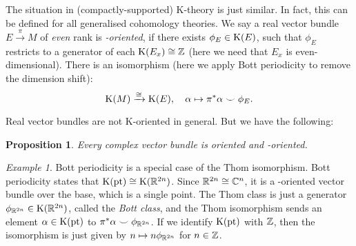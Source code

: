\documentclass[reqno]{scrartcl}
\newtheorem{proposition}[theorem]{Proposition}
\theoremstyle{definition}
\theoremstyle{remark}
\newtheorem{example}[theorem]{Example}
\renewcommand{\cup}{\smile}
\begin{document}
The situation in (compactly-supported) K-theory is just similar. In fact, this can be defined for all generalised cohomology theories. We say a real vector bundle $E\xrightarrow{\pi}M$ of \emph{even} rank is \emph{\K-oriented}, if there exists $\phi_E\in\operatorname{K}(E)$, such that $\phi_E$ restricts to a generator of each $\operatorname{K}(E_x)\cong\mathbb{Z}$ (here we need that $E_x$ is even-dimensional). There is an isomorphism (here we apply Bott periodicity to remove the dimension shift):
\[ \K(M)\xrightarrow{\cong}\K(E),\quad \alpha\mapsto\pi^*\alpha\cup\phi_E. \]

Real vector bundles are not K-oriented in general. But we have the following:
\begin{proposition}\label{Prop: complex vector bundles are oriented and K-oriented}
Every complex vector bundle is oriented and \K-oriented.
\end{proposition}

\begin{example}
Bott periodicity is a special case of the Thom isomorphism. Bott periodicity states that $\operatorname{K}(\operatorname{pt})\cong\operatorname{K}(\mathbb{R}^{2n})$. Since $\mathbb{R}^{2n}\cong\mathbb{C}^{n}$, it is a \K-oriented vector bundle over the base, which is a single point. The Thom class is just a generator $\phi_{\mathbb{R}^{2n}}\in\operatorname{K}(\mathbb{R}^{2n})$, called the \emph{Bott class}, and the Thom isomorphism sends an element $\alpha\in\operatorname{K}(\operatorname{pt})$ to $\pi^*\alpha\cup\phi_{\R^{2n}}$. If we identify $\operatorname{K}(\operatorname{pt})$ with $\mathbb{Z}$, then the isomorphism is just given by $n\mapsto n\phi_{\mathbb{R}^{2n}}$ for $n\in\mathbb{Z}$.
\end{example}
\end{document}
